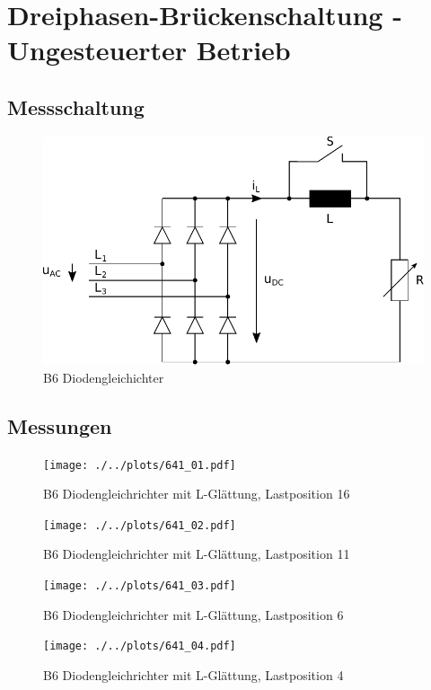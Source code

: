 \section{Dreiphasen-Brückenschaltung - Ungesteuerter Betrieb}

\subsection{Messschaltung}

\begin{figure}[h!]
    \centering
    \includegraphics[scale=\sscale]{./../fig/b6_diode.pdf}
    \caption{B6 Diodengleichichter}
    \label{fig:b6_diode}
\end{figure}

\subsection{Messungen}

\begin{figure}[h!]
    \centering
    \texttt{[image: ./../plots/641\_01.pdf]}
    \caption{B6 Diodengleichrichter mit L-Glättung, Lastposition 16}
\end{figure}

\begin{figure}[h!]
    \centering
    \texttt{[image: ./../plots/641\_02.pdf]}
    \caption{B6 Diodengleichrichter mit L-Glättung, Lastposition 11}
\end{figure}

\begin{figure}[h!]
    \centering
    \texttt{[image: ./../plots/641\_03.pdf]}
    \caption{B6 Diodengleichrichter mit L-Glättung, Lastposition 6}
\end{figure}

\begin{figure}[h!]
    \centering
    \texttt{[image: ./../plots/641\_04.pdf]}
    \caption{B6 Diodengleichrichter mit L-Glättung, Lastposition 4}
\end{figure}

\clearpage
